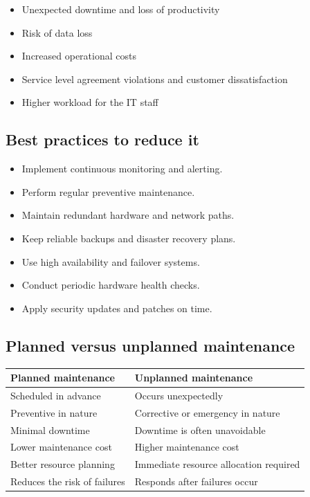 \documentclass[11pt,a4paper]{article}
\begin{document}
\begin{itemize}\itemsep2pt
  \item Unexpected downtime and loss of productivity
  \item Risk of data loss
  \item Increased operational costs
  \item Service level agreement violations and customer dissatisfaction
  \item Higher workload for the IT staff
\end{itemize}

\subsection{Best practices to reduce it}

\begin{itemize}\itemsep2pt
  \item Implement continuous monitoring and alerting.
  \item Perform regular preventive maintenance.
  \item Maintain redundant hardware and network paths.
  \item Keep reliable backups and disaster recovery plans.
  \item Use high availability and failover systems.
  \item Conduct periodic hardware health checks.
  \item Apply security updates and patches on time.
\end{itemize}

\subsection{Planned versus unplanned maintenance}

\begin{tabularx}{\textwidth}{@{}XX@{}}
\toprule
\rowcolor{tablehead}\textbf{Planned maintenance} & \textbf{Unplanned maintenance} \\
\midrule
Scheduled in advance & Occurs unexpectedly \\
\addlinespace
Preventive in nature & Corrective or emergency in nature \\
\addlinespace
Minimal downtime & Downtime is often unavoidable \\
\addlinespace
Lower maintenance cost & Higher maintenance cost \\
\addlinespace
Better resource planning & Immediate resource allocation required \\
\addlinespace
Reduces the risk of failures & Responds after failures occur \\
\bottomrule
\end{tabularx}
\end{document}
